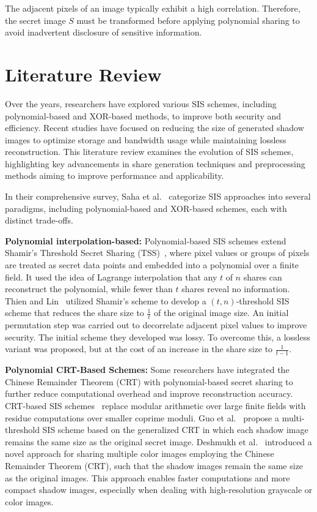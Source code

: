 The adjacent pixels of an image typically exhibit a high correlation. Therefore, the secret image $S$ must be transformed before applying polynomial sharing to avoid inadvertent disclosure of sensitive information.

\section{Literature Review}
 
Over the years, researchers have explored various SIS schemes, including polynomial-based and XOR-based methods, to improve both security and efficiency. Recent studies have focused on reducing the size of generated shadow images to optimize storage and bandwidth usage while maintaining lossless reconstruction. This literature review examines the evolution of SIS schemes, highlighting key advancements in share generation techniques and preprocessing methods aiming to improve performance and applicability.
 
 
In their comprehensive survey, Saha et al.~\cite{saha2023} categorize SIS approaches into several paradigms, including polynomial-based and XOR-based schemes, each with distinct trade-offs.
 
\textbf{Polynomial interpolation-based:} Polynomial-based SIS schemes extend Shamir's Threshold Secret Sharing (TSS)~\cite{shamir1979share}, where pixel values or groups of pixels are treated as secret data points and embedded into a polynomial over a finite field. It used the idea of Lagrange interpolation that any $t$ of $n$ shares can reconstruct the polynomial, while fewer than $t$ shares reveal no information. Thien and Lin~\cite{thien2002secret} utilized Shamir's scheme to develop a $(t, n)$-threshold SIS scheme that reduces the share size to $\frac{1}{t}$ of the original image size. An initial permutation step was carried out to decorrelate adjacent pixel values to improve security. The initial scheme they developed was lossy. To overcome this, a lossless variant was proposed, but at the cost of an increase in the share size to $\frac{1}{t-1}$.
 
\textbf{Polynomial CRT-Based Schemes:} Some researchers have integrated the Chinese Remainder Theorem (CRT) with polynomial-based secret sharing to further reduce computational overhead and improve reconstruction accuracy. CRT-based SIS schemes~\cite{shyu2008} replace modular arithmetic over large finite fields with residue computations over smaller coprime moduli. Guo et al.~\cite{guo2016} propose a multi-threshold SIS scheme based on the generalized CRT in which each shadow image remains the same size as the original secret image. Deshmukh et al.~\cite{deshmukh2017} introduced a novel approach for sharing multiple color images employing the Chinese Remainder Theorem (CRT), such that the shadow images remain the same size as the original images. This approach enables faster computations and more compact shadow images, especially when dealing with high-resolution grayscale or color images.
 
